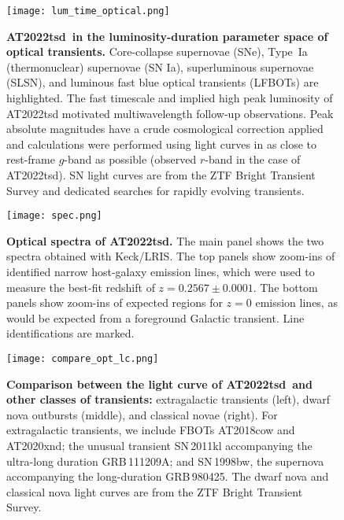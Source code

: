 \documentclass{nature_plusfigure}
\newcommand{\at}{AT2022tsd}
\begin{document}
\clearpage

\begin{extended_data}

\renewcommand{\thefigure}{\arabic{figure}~Extended~Data}
\renewcommand{\thefigure}{Extended Data Figure \arabic{figure}}
\renewcommand{\figurename}{}
\setcounter{figure}{0}

\renewcommand{\thetable}{\arabic{table}~Extended~Data}
\renewcommand{\thetable}{Extended Data Table \arabic{table}}
\renewcommand{\tablename}{}
\setcounter{table}{0}

\begin{figure}[ht]
\centering
\texttt{[image: lum\_time\_optical.png]}
\caption{\textbf{\at\ in the luminosity-duration parameter space of optical transients.} Core-collapse supernovae (SNe), Type~Ia (thermonuclear) supernovae (SN Ia), superluminous supernovae (SLSN), and luminous fast blue optical transients (LFBOTs\cite{Prentice2018,Perley2019,Perley2021,Ho2020_Koala,Yao2022,Coppejans2020}) are highlighted. The fast timescale and implied high peak luminosity of AT2022tsd motivated multiwavelength follow-up observations. Peak absolute magnitudes have a crude cosmological correction applied and calculations were performed using light curves in as close to rest-frame $g$-band as possible (observed $r$-band in the case of \at). SN light curves are from the ZTF Bright Transient Survey\cite{PerleyBTS,FremlingBTS} and dedicated searches for rapidly evolving transients\cite{Ho2022_RET}.}
\label{fig:opt-phase-space}
\end{figure}

\begin{figure}[ht]
 \centering
\texttt{[image: spec.png]}
  \caption{\textbf{Optical spectra of \at.} The main panel shows the two spectra obtained with Keck/LRIS. The top panels show zoom-ins of identified narrow host-galaxy emission lines, which were used to measure the best-fit redshift of $z=0.2567\pm0.0001$. The bottom panels show zoom-ins of expected regions for $z=0$ emission lines, as would be expected from a foreground Galactic transient. Line identifications are marked.}
 \label{fig:spec}
\end{figure}

\begin{figure}[ht]
 \centering
\texttt{[image: compare\_opt\_lc.png]}
  \caption{\textbf{Comparison between the light curve of \at\ and other classes of transients:} extragalactic transients (left), dwarf nova outbursts (middle), and classical novae (right). For extragalactic transients, we include FBOTs AT2018cow\cite{Perley2019} and AT2020xnd\cite{Perley2021}; the unusual transient SN\,2011kl accompanying the ultra-long duration GRB\,111209A; and SN\,1998bw, the supernova accompanying the long-duration GRB\,980425. The dwarf nova and classical nova light curves are from the ZTF Bright Transient Survey\cite{Perley2020}.}
 \label{fig:opt-lc-comparison}
\end{figure}


\end{extended_data}
\end{document}

